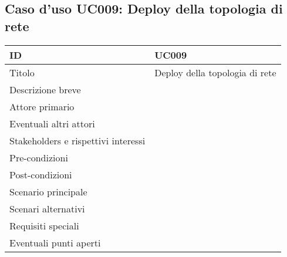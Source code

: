 \documentclass[../../main.tex]{subfiles}
\begin{document}
\subsection{Caso d’uso UC009: Deploy della topologia di rete }
\begin{tabularx}{150mm}{|l|X|}
    \hline
    ID                                  & \textbf{UC009}\\
    \hline
    Titolo                              & Deploy della topologia di rete \\
    \hline
    Descrizione breve                   &    \\
    \hline
    Attore primario                     &    \\
    \hline
    Eventuali altri attori              &    \\
    \hline
    Stakeholders e rispettivi interessi &    \\
    \hline
    Pre-condizioni                      &    \\
    \hline
    Post-condizioni                     &    \\
    \hline
    Scenario principale                 &    \\
    \hline
    Scenari alternativi                 &    \\
    \hline
    Requisiti speciali                  &    \\
    \hline
    Eventuali punti aperti              &    \\
    \hline
\end{tabularx}
\newpage
\end{document}
